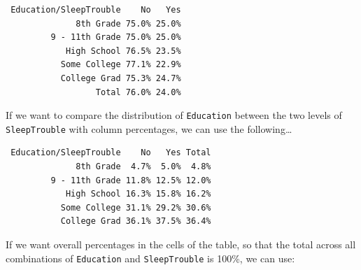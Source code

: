 \documentclass[
]{book}
\newenvironment{Shaded}{\begin{snugshade}}{\end{snugshade}}
\newcommand{\DataTypeTok}[1]{\textcolor[rgb]{0.13,0.29,0.53}{#1}}
\newcommand{\KeywordTok}[1]{\textcolor[rgb]{0.13,0.29,0.53}{\textbf{#1}}}
\newcommand{\NormalTok}[1]{#1}
\newcommand{\OperatorTok}[1]{\textcolor[rgb]{0.81,0.36,0.00}{\textbf{#1}}}
\newcommand{\StringTok}[1]{\textcolor[rgb]{0.31,0.60,0.02}{#1}}
\begin{document}
\begin{verbatim}
 Education/SleepTrouble    No   Yes
              8th Grade 75.0% 25.0%
         9 - 11th Grade 75.0% 25.0%
            High School 76.5% 23.5%
           Some College 77.1% 22.9%
           College Grad 75.3% 24.7%
                  Total 76.0% 24.0%
\end{verbatim}

If we want to compare the distribution of \texttt{Education} between the two levels of \texttt{SleepTrouble} with column percentages, we can use the following\ldots{}

\begin{Shaded}
\end{Shaded}

\begin{verbatim}
 Education/SleepTrouble    No   Yes Total
              8th Grade  4.7%  5.0%  4.8%
         9 - 11th Grade 11.8% 12.5% 12.0%
            High School 16.3% 15.8% 16.2%
           Some College 31.1% 29.2% 30.6%
           College Grad 36.1% 37.5% 36.4%
\end{verbatim}

If we want overall percentages in the cells of the table, so that the total across all combinations of \texttt{Education} and \texttt{SleepTrouble} is 100\%, we can use:

\begin{Shaded}
\end{Shaded}
\end{document}
